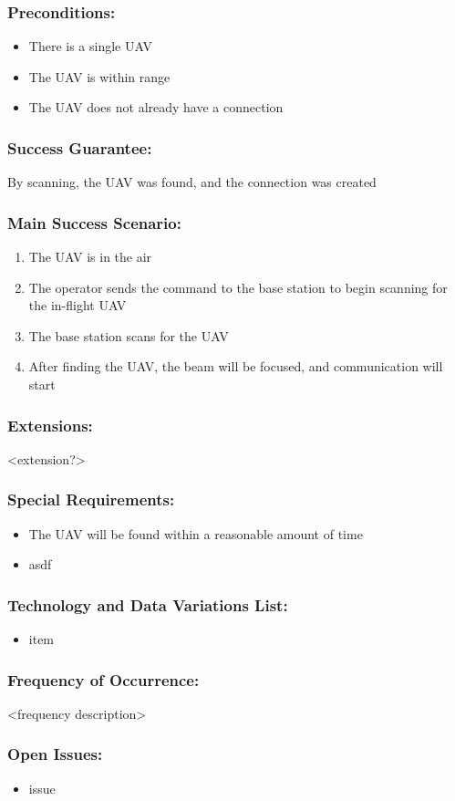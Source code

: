 \documentclass[ProjectRequirements.tex]{subfiles}
\begin{document}
		\subsubsection{Preconditions:}
			\begin{itemize}\itemsep1pt
				\item There is a single UAV
				\item The UAV is within range
				\item The UAV does not already have a connection
			\end{itemize}
		\subsubsection{Success Guarantee:}
			By scanning, the UAV was found, and the connection was created
		\subsubsection{Main Success Scenario:}
			\begin{enumerate}\itemsep1pt
				\item The UAV is in the air
				\item The operator sends the command to the base station to begin scanning for the in-flight UAV
				\item The base station scans for the UAV
				\item After finding the UAV, the beam will be focused, and communication will start
			\end{enumerate}
		\subsubsection{Extensions:}
			<extension?>
		\subsubsection{Special Requirements:}
			\begin{itemize}\itemsep1pt
				\item The UAV will be found within a reasonable amount of time
				\item asdf
			\end{itemize}
		\subsubsection{Technology and Data Variations List:}
			\begin{itemize}\itemsep1pt
				\item item
			\end{itemize}
		\subsubsection{Frequency of Occurrence:}
			<frequency description>
		\subsubsection{Open Issues:}
			\begin{itemize}\itemsep1pt
				\item issue
			\end{itemize}		
		
		
		
\end{document}
